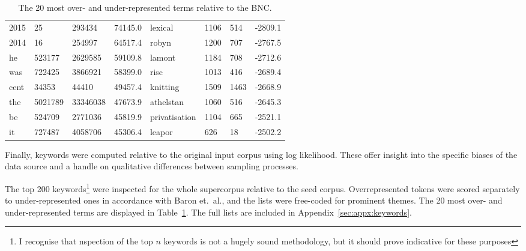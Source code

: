 \begin{table}[hb]
\begin{tabular}{@{}llll||llll@{}}
        2015       & 25             & 293434          & 74145.0      & lexical       & 1106           & 514             & -2809.1      \\
        2014       & 16             & 254997          & 64517.4      & robyn         & 1200           & 707             & -2767.5      \\
        he         & 523177         & 2629585         & 59109.8      & lamont        & 1184           & 708             & -2712.6      \\
        was        & 722425         & 3866921         & 58399.0      & risc          & 1013           & 416             & -2689.4      \\
        cent       & 34353          & 44410           & 49457.4      & knitting      & 1509           & 1463            & -2668.9      \\
        the        & 5021789        & 33346038        & 47673.9      & athelstan     & 1060           & 516             & -2645.3      \\
        be         & 524709         & 2771036         & 45819.9      & privatisation & 1104           & 665             & -2521.1      \\
        it         & 727487         & 4058706         & 45306.4      & leapor        & 626            & 18              & -2502.2      \\ \hline
    \end{tabular}

    \caption{The 20 most over- and under-represented terms relative to the BNC.}
    \label{table:evaluation:retrieval:keywords}

\end{table}






Finally, keywords were computed relative to the original input corpus using log likelihood.  These offer insight into the specific biases of the data source and a handle on qualitative differences between sampling processes.  



The top 200 keywords\footnote{I recognise that nspection of the top $n$ keywords is not a hugely sound methodology, but it should prove indicative for these purposes} were inspected for the whole supercorpus relative to the seed corpus. Overrepresented tokens were scored separately to under-represented ones in accordance with Baron et.\ al.\cite{baron2009word}, and the lists were free-coded for prominent themes.  The 20 most over- and under-represented terms are displayed in Table~\ref{table:evaluation:retrieval:keywords}.  The full lists are included in Appendix~\ref{sec:appx:keywords}.


